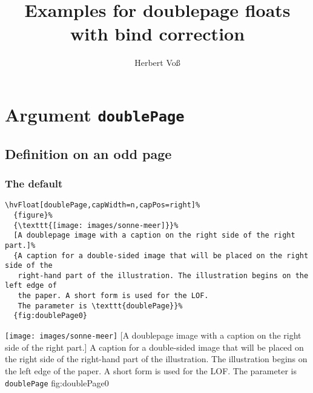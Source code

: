 \documentclass[twoside]{scrartcl}
\makeatletter
\let\hvBlindtext\Blindtext
\def\Blindtext{\par\color{black!40}\hvBlindtext\par\normalcolor}
\def\hvblindtext{\textcolor{black!40}{\blindtext@text}}
\makeatother
\begin{document}
\title{Examples for doublepage floats \newline with bind correction}
\author{Herbert Voß}
\maketitle

\tableofcontents



\newpage


\section{Argument \texttt{doublePage}}
\subsection{Definition on an odd page}

\Blindtext\hvblindtext

\hvblindtext

\subsubsection{The default}


\begin{lstlisting}
\hvFloat[doublePage,capWidth=n,capPos=right]%
  {figure}%
  {\texttt{[image: images/sonne-meer]}}%
  [A doublepage image with a caption on the right side of the right part.]%
  {A caption for a double-sided image that will be placed on the right side of the
   right-hand part of the illustration. The illustration begins on the left edge of 
   the paper. A short form is used for the LOF. 
   The parameter is \texttt{doublePage}}%
  {fig:doublePage0}
\end{lstlisting}


%
  {\texttt{[image: images/sonne-meer]}}%
  [A doublepage image with a caption on the right side of the right part.]%
  {A caption for a double-sided image that will be placed on the right side of the
   right-hand part of the illustration. The illustration begins on the left edge of 
   the paper. A short form is used for the LOF. 
   The parameter is \texttt{doublePage}}%
  {fig:doublePage0}

\Blindtext

\Blindtext

\Blindtext
\end{document}
